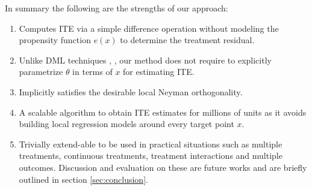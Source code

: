 \documentclass[sigconf]{acmart}
\theoremstyle{plain}
\numberwithin{equation}{section}
\begin{document}
In summary the following are the strengths of our approach:
\begin{enumerate}[{(}1{)}]
\item Computes ITE via a simple difference operation without modeling the propensity function $e(x)$ to determine the treatment residual.
\item Unlike DML techniques  \cite{doubleMLdebiased}, \cite{doubleML}, our method does not require to explicitly parametrize $\theta$ in terms of $x$ for estimating ITE.
\item Implicitly satisfies the desirable local Neyman orthogonality.
\item A scalable algorithm to obtain ITE estimates for millions of units as it avoids building local regression models around every target point $x$.
\item Trivially extend-able to be used in practical situations such as multiple treatments, continuous treatments, treatment interactions and multiple outcomes. Discussion and evaluation on these are future works and are briefly outlined in section \ref{sec:conclusion}. 
\end{enumerate}
\end{document}
